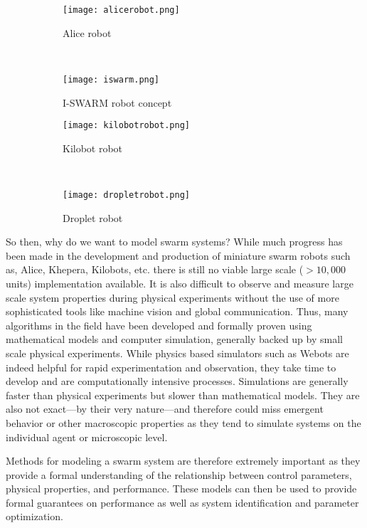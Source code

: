 \documentclass[Main.tex]{subfiles}
\begin{document}
\begin{figure}[htb]
\centering\begin{subfigure}{.5\textwidth}
\centering\texttt{[image: alicerobot.png]}
\caption{Alice robot}
\end{subfigure}~
\centering\begin{subfigure}{.5\textwidth}
\centering\texttt{[image: iswarm.png]}
\caption{I-SWARM robot concept}
\end{subfigure}\vspace{1cm}
\centering\begin{subfigure}{.5\textwidth}
\centering\texttt{[image: kilobotrobot.png]}
\caption{Kilobot robot}
\end{subfigure}~
\centering\begin{subfigure}{.5\textwidth}
\centering\texttt{[image: dropletrobot.png]}
\caption{Droplet robot}
\end{subfigure}
\caption{}\label{fig:swarmbots}
\end{figure} 

So then, why do we want to model swarm systems? While much progress has been made in the development and production of miniature swarm robots such as, Alice, Khepera, Kilobots, etc.\cite{Dorigo2005, Seyfried2005, Mondada2009, Caprari1998, Rubenstein2012} there is still no viable large scale ($> 10,000$ units) implementation available. It is also difficult to observe and measure large scale system properties during physical experiments without the use of more sophisticated tools like machine vision and global communication. Thus, many algorithms in the field have been developed and formally proven using mathematical models and computer simulation, generally backed up by small scale physical experiments. While physics based simulators such as Webots\cite{Michel1998} are indeed helpful for rapid experimentation and observation, they take time to develop and are computationally intensive processes. Simulations are generally faster than physical experiments but slower than mathematical models. They are also not exact---by their very nature---and therefore could miss emergent behavior or other macroscopic properties as they tend to simulate systems on the individual agent or microscopic level. 

Methods for modeling a swarm system are therefore extremely important as they provide a formal understanding of the relationship between control parameters, physical properties, and performance. These models can then be used to provide formal guarantees on performance as well as system identification and parameter optimization\cite{Correll2006a, Correll2008}.
\end{document}
